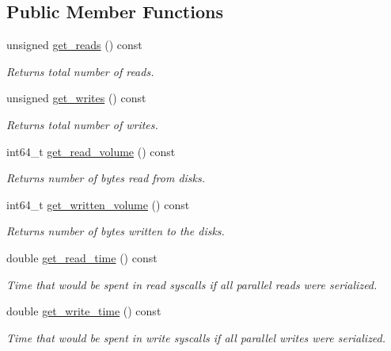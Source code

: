 \subsection*{Public Member Functions}
\begin{CompactItemize}
\item 
unsigned \hyperlink{group__iolayer_g6263716c232b9ebe0936f34fd25dd8d4}{get\_\-reads} () const 
\begin{CompactList}\small\item\em Returns total number of reads. \item\end{CompactList}\item 
unsigned \hyperlink{group__iolayer_gf75ae32372c803dcf31e58b0a5e312e2}{get\_\-writes} () const 
\begin{CompactList}\small\item\em Returns total number of writes. \item\end{CompactList}\item 
int64\_\-t \hyperlink{group__iolayer_g32d9c7436d0728f59ce53c269484ced3}{get\_\-read\_\-volume} () const 
\begin{CompactList}\small\item\em Returns number of bytes read from disks. \item\end{CompactList}\item 
int64\_\-t \hyperlink{group__iolayer_g29a2dd5f32d956bae0b02503ac7d0876}{get\_\-written\_\-volume} () const 
\begin{CompactList}\small\item\em Returns number of bytes written to the disks. \item\end{CompactList}\item 
double \hyperlink{group__iolayer_g5425890c2062eb9bed6a73343b8ffb25}{get\_\-read\_\-time} () const 
\begin{CompactList}\small\item\em Time that would be spent in read syscalls if all parallel reads were serialized. \item\end{CompactList}\item 
double \hyperlink{group__iolayer_g38c56edfce29a67fc2312dd2d012caaa}{get\_\-write\_\-time} () const 
\begin{CompactList}\small\item\em Time that would be spent in write syscalls if all parallel writes were serialized. \item\end{CompactList}\item 

\end{CompactItemize}
